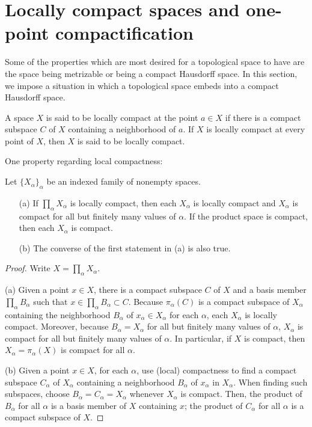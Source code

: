 \section{Locally compact spaces and one-point compactification}

Some of the properties which are most desired for a topological space to have are the space being metrizable or being a compact Hausdorff space.
In this section, we impose a situation in which a topological space embeds into a compact Hausdorff space.

\begin{defi}
    A space $X$ is said to be locally compact at the point $a\in X$ if there is a compact subspace $C$ of $X$ containing a neighborhood of $a$.
    If $X$ is locally compact at every point of $X$, then $X$ is said to be locally compact.
\end{defi}

One property regarding local compactness:
\begin{prop}
    Let $\{X_\alpha\}_\alpha$ be an indexed family of nonempty spaces.
    \begin{enumerate}
        \item[(a)]
        {
            If $\prod_\alpha X_\alpha$ is locally compact, then each $X_\alpha$ is locally compact and $X_\alpha$ is compact for all but finitely many values of $\alpha$.
            If the product space is compact, then each $X_\alpha$ is compact.
        }
        \item[(b)]
        {
            The converse of the first statement in (a) is also true.
        }
    \end{enumerate}
\end{prop}
\begin{proof}
    Write $X=\prod_\alpha X_\alpha$.

    \hangindent=0.65cm
    \noindent(a)
    Given a point $x\in X$, there is a compact subspace $C$ of $X$ and a basis member $\prod_\alpha B_\alpha$ such that $x\in\prod_\alpha B_\alpha\subset C$.
    Because $\pi_\alpha(C)$ is a compact subspace of $X_\alpha$ containing the neighborhood $B_\alpha$ of $x_\alpha\in X_\alpha$ for each $\alpha$, each $X_\alpha$ is locally compact.
    Moreover, because $B_\alpha=X_\alpha$ for all but finitely many values of $\alpha$, $X_\alpha$ is compact for all but finitely many values of $\alpha$.
    In particular, if $X$ is compact, then $X_\alpha=\pi_\alpha(X)$ is compact for all $\alpha$.
    
    \noindent(b)
    Given a point $x\in X$, for each $\alpha$, use (local) compactness to find a compact subspace $C_\alpha$ of $X_\alpha$ containing a neighborhood $B_\alpha$ of $x_\alpha$ in $X_\alpha$.
    When finding such subspaces, choose $B_\alpha=C_\alpha=X_\alpha$ whenever $X_\alpha$ is compact.
    Then, the product of $B_\alpha$ for all $\alpha$ is a basis member of $X$ containing $x$; the product of $C_\alpha$ for all $\alpha$ is a compact subspace of $X$.
\end{proof}

